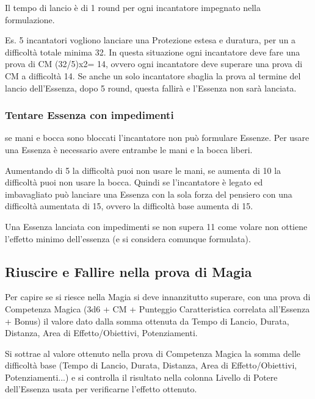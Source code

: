 \documentclass[a4paper,11pt,twoside,openany]{book}
\begin{document}
Il tempo di lancio è di 1 round per ogni incantatore impegnato nella formulazione.

Es. 5 incantatori vogliono lanciare una Protezione estesa e duratura, per un a difficoltà totale minima 32. In questa situazione ogni incantatore deve fare una prova di CM (32/5)x2= 14, ovvero ogni incantatore deve superare una prova di CM a difficoltà 14. Se anche un solo incantatore sbaglia la prova al termine del lancio dell'Essenza, dopo 5 round, questa fallirà e l'Essenza non sarà lanciata.

\subsubsection{Tentare Essenza con impedimenti}

se mani e bocca sono bloccati l'incantatore non può formulare Essenze. Per usare una Essenza è necessario avere entrambe le mani e la bocca liberi.

Aumentando di 5 la difficoltà puoi non usare le mani, se aumenta di 10 la difficoltà puoi non usare la bocca. Quindi se l'incantatore è legato ed imbavagliato può lanciare una Essenza con la sola forza del pensiero con una difficoltà aumentata di 15, ovvero la difficoltà base aumenta di 15.

Una Essenza lanciata con impedimenti se non supera 11 come volare non ottiene l'effetto minimo dell'essenza (e si considera comunque formulata).

\subsection{Riuscire e Fallire nella prova di Magia}

\label{riuscire-e-fallire-nella-prova-di-magia}

Per capire se si riesce nella Magia si deve innanzitutto superare, con una prova di Competenza Magica (3d6 + CM + Punteggio Caratteristica correlata all'Essenza + Bonus) il valore dato dalla somma ottenuta da Tempo di Lancio, Durata, Distanza, Area di Effetto/Obiettivi, Potenziamenti.

Si sottrae al valore ottenuto nella prova di Competenza Magica la somma delle difficoltà base (Tempo di Lancio, Durata, Distanza, Area di Effetto/Obiettivi, Potenziamenti...) e si controlla il risultato nella colonna Livello di Potere dell'Essenza usata per verificarne l'effetto ottenuto.
\end{document}
